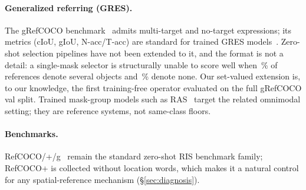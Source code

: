 \paragraph{Generalized referring (GRES).}
The gRefCOCO benchmark~\cite{liu2023gres} admits multi-target and no-target
expressions; its metrics (cIoU, gIoU, N-acc/T-acc) are standard for trained
GRES models~\cite{liu2023gres, wang2025mllm}. Zero-shot selection pipelines
have not been extended to it, and the format is not a detail: a
single-mask selector is structurally unable to score well when
\gresMultiPct\,\% of references denote several objects and
\gresNoTargetPct\,\% denote none. Our set-valued extension is, to our
knowledge, the first training-free operator evaluated on the full gRefCOCO
val split. Trained mask-group models such as RAS~\cite{ras2025} target the
related omnimodal setting; they are reference systems, not same-class floors.

\paragraph{Benchmarks.}
RefCOCO/+/g~\cite{kazemzadeh2014refer, mao2016generation} remain the standard
zero-shot RIS benchmark family; RefCOCO+ is collected without location words,
which makes it a natural control for any spatial-reference mechanism
(\S\ref{sec:diagnosis}).
